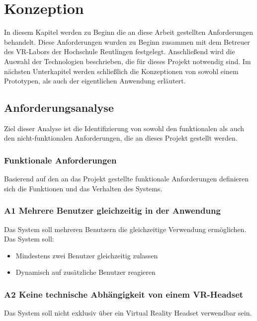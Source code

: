 \section{Konzeption} \label{Konzeption}
In diesem Kapitel werden zu Beginn die an diese Arbeit gestellten Anforderungen behandelt. Diese Anforderungen wurden zu Beginn zusammen mit dem Betreuer des VR-Labors der Hochschule Reutlingen festgelegt. Anschließend wird die Auswahl der Technologien beschrieben, die für dieses Projekt notwendig sind. Im nächsten Unterkapitel werden schließlich die Konzeptionen von sowohl einem Prototypen, als auch der eigentlichen Anwendung erläutert.  

\subsection{Anforderungsanalyse}
Ziel dieser Analyse ist die Identifizierung von sowohl den funktionalen als auch den nicht-funktionalen Anforderungen, die an dieses Projekt gestellt werden. 

\subsubsection{Funktionale Anforderungen}
Basierend auf den an das Projekt gestellte funktionale Anforderungen definieren sich die Funktionen und das Verhalten des Systems.

\subsubsection*{A1 Mehrere Benutzer gleichzeitig in der Anwendung \label{A1}}

Das System soll mehreren Benutzern die gleichzeitige Verwendung ermöglichen.\\

Das System soll: 
\begin{itemize}
\item Mindestens zwei Benutzer gleichzeitig zulassen
\item Dynamisch auf zusätzliche Benutzer reagieren
\end{itemize}

	
\subsubsection*{A2 \label{A2} Keine technische Abhängigkeit von einem VR-Headset}
Das System soll nicht exklusiv über ein Virtual Reality Headset verwendbar sein.\\

